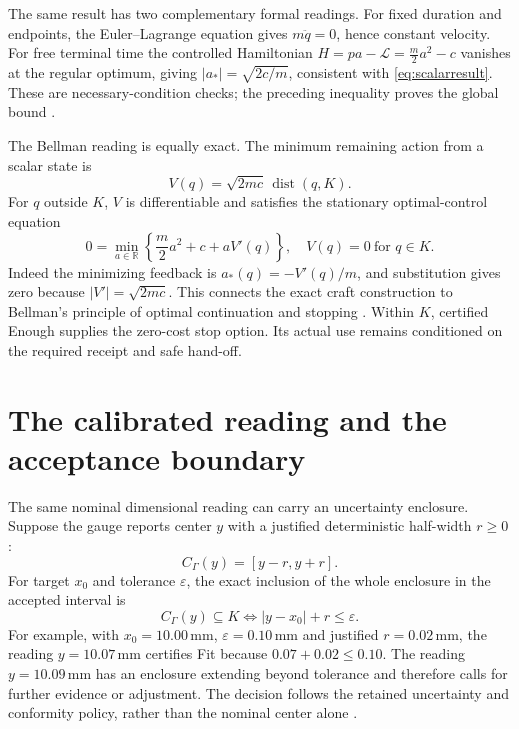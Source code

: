 \documentclass[11pt,letterpaper]{article}
\theoremstyle{definition}\newtheorem{definition}{Definition}
\newcommand{\Lag}{\mathscr L}
\newcommand{\dist}{\operatorname{dist}}
\begin{document}
The same result has two complementary formal readings. For fixed duration and endpoints, the Euler--Lagrange equation gives $m\ddot q=0$, hence constant velocity. For free terminal time the controlled Hamiltonian $H=p a-\Lag=\tfrac m2a^2-c$ vanishes at the regular optimum, giving $|a_*|=\sqrt{2c/m}$, consistent with \eqref{eq:scalarresult}. These are necessary-condition checks; the preceding inequality proves the global bound \cite{lagrange,hamilton,pontryagin}.

The Bellman reading is equally exact. The minimum remaining action from a scalar state is
\begin{equation}\label{eq:value}
V(q)=\sqrt{2mc}\,\dist(q,K).
\end{equation}
For $q$ outside $K$, $V$ is differentiable and satisfies the stationary optimal-control equation
\begin{equation}\label{eq:hjb}
\boxed{0=\min_{a\in\mathbb R}\left\{\frac m2a^2+c+aV'(q)\right\},\quad
V(q)=0\ \text{for }q\in K.}
\end{equation}
Indeed the minimizing feedback is $a_*(q)=-V'(q)/m$, and substitution gives zero because $|V'|=\sqrt{2mc}$. This connects the exact craft construction to Bellman's principle of optimal continuation and stopping \cite{bellman}. Within $K$, certified Enough supplies the zero-cost stop option. Its actual use remains conditioned on the required receipt and safe hand-off.

\section{The calibrated reading and the acceptance boundary}
The same nominal dimensional reading can carry an uncertainty enclosure. Suppose the gauge reports center $y$ with a justified deterministic half-width $r\ge0$:
\[
C_\Gamma(y)=[y-r,y+r].
\]
For target $x_0$ and tolerance $\varepsilon$, the exact inclusion of the whole enclosure in the accepted interval is
\begin{equation}\label{eq:certtol}
\boxed{C_\Gamma(y)\subseteq K\iff|y-x_0|+r\le\varepsilon.}
\end{equation}
For example, with $x_0=10.00\,\mathrm{mm}$, $\varepsilon=0.10\,\mathrm{mm}$ and justified $r=0.02\,\mathrm{mm}$, the reading $y=10.07\,\mathrm{mm}$ certifies Fit because $0.07+0.02\le0.10$. The reading $y=10.09\,\mathrm{mm}$ has an enclosure extending beyond tolerance and therefore calls for further evidence or adjustment. The decision follows the retained uncertainty and conformity policy, rather than the nominal center alone \cite{gum,conformity}.
\end{document}
